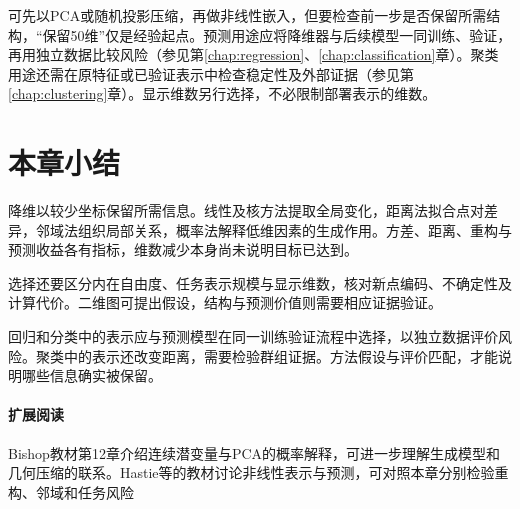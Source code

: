可先以PCA或随机投影压缩，再做非线性嵌入，但要检查前一步是否保留所需结构，“保留50维”仅是经验起点。预测用途应将降维器与后续模型一同训练、验证，再用独立数据比较风险（参见第\ref{chap:regression}、\ref{chap:classification}章）。聚类用途还需在原特征或已验证表示中检查稳定性及外部证据（参见第\ref{chap:clustering}章）。显示维数另行选择，不必限制部署表示的维数。

\section{本章小结}
\label{sec:dim-summary}

降维以较少坐标保留所需信息。线性及核方法提取全局变化，距离法拟合点对差异，邻域法组织局部关系，概率法解释低维因素的生成作用。方差、距离、重构与预测收益各有指标，维数减少本身尚未说明目标已达到。

选择还要区分内在自由度、任务表示规模与显示维数，核对新点编码、不确定性及计算代价。二维图可提出假设，结构与预测价值则需要相应证据验证。

回归和分类中的表示应与预测模型在同一训练验证流程中选择，以独立数据评价风险。聚类中的表示还改变距离，需要检验群组证据。方法假设与评价匹配，才能说明哪些信息确实被保留。

\paragraph{扩展阅读}
Bishop教材第12章介绍连续潜变量与PCA的概率解释，可进一步理解生成模型和几何压缩的联系。Hastie等的教材讨论非线性表示与预测，可对照本章分别检验重构、邻域和任务风险